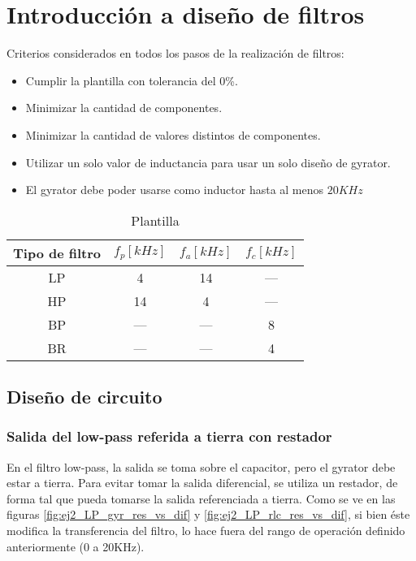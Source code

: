 \documentclass[../../tc_tp3_main.tex]{subfiles}
\begin{document}
\chapter{Introducci\'on a dise\~no de filtros}


Criterios considerados en todos los pasos de la realizaci\'on de filtros:

\begin{itemize}
	\item Cumplir la plantilla con tolerancia del 0\%.
	\item Minimizar la cantidad de componentes. 
	\item Minimizar la cantidad de valores distintos de componentes.
	\item Utilizar un solo valor de inductancia para usar un solo dise\~no de gyrator.
	\item El gyrator debe poder usarse como inductor hasta al menos $20KHz$
\end{itemize}




\begin{table}[htbp]
\centering
\begin{tabular}{|c|c|c|c|}
\hline 
Tipo de filtro & $f_p[kHz]$ & $f_a[kHz]$ & $f_c[kHz]$ \\ 
\hline 
LP & 4   & 14  & --- \\ 
\hline 
HP & 14  & 4   & --- \\ 
\hline 
BP & --- & --- & 8   \\ 
\hline 
BR & --- & --- & 4   \\ 
\hline 
\end{tabular}
\caption{Plantilla}
\label{tab:ej2_plantilla} 
\end{table}









\section{Dise\~no de circuito}

\subsection{Salida del low-pass referida a tierra con restador}

En el filtro low-pass, la salida se toma sobre el capacitor, pero el gyrator debe estar a tierra. Para evitar tomar la salida diferencial, se utiliza un restador, de forma tal que pueda tomarse la salida referenciada a tierra. Como se ve en las figuras \ref{fig:ej2_LP_gyr_res_vs_dif} y \ref{fig:ej2_LP_rlc_res_vs_dif}, si bien \'este modifica la transferencia del filtro, lo hace fuera del rango de operaci\'on definido anteriormente (0 a 20KHz). \par
\end{document}
